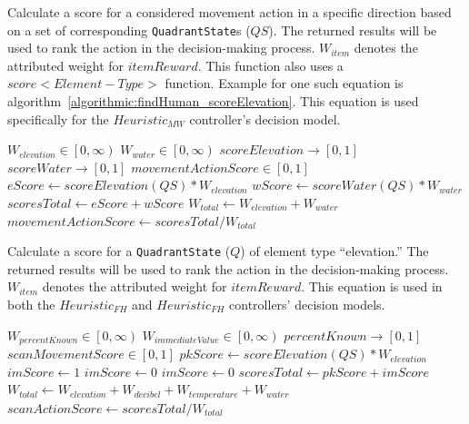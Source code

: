 \begin{algorithm}[H]
  \caption[Heuristic - Score Potential Movement Action (Map Water)]{Calculate a score for a considered movement action in a specific direction based on a set of corresponding \texttt{QuadrantState}s ($QS$). The returned results will be used to rank the action in the decision-making process. $W_{item}$ denotes the attributed weight for $itemReward$. This function also uses a $score<Element-Type>$ function. Example for one such equation is algorithm~\ref{algorithmic:findHuman_scoreElevation}. This equation is used specifically for the $Heuristic_{MW}$ controller's decision model.}
  \begin{algorithmic} \label{algorithmic:mapWater_scoreMovementAction}
    \REQUIRE $W_{elevation} \in \left[0, \infty \right)$
    \REQUIRE $W_{water} \in \left[0, \infty \right)$
    \ENSURE $scoreElevation \rightarrow \left[0, 1 \right]$
    \ENSURE $scoreWater \rightarrow \left[0, 1 \right]$
    \ENSURE $movementActionScore \in \left[0, 1 \right]$
    \STATE $eScore \leftarrow scoreElevation(QS) * W_{elevation}$
    \STATE $wScore \leftarrow scoreWater(QS) * W_{water}$
    \STATE $scoresTotal \leftarrow eScore + wScore$
    \STATE $W_{total} \leftarrow W_{elevation} + W_{water}$
    \RETURN $movementActionScore \leftarrow scoresTotal / W_{total}$
  \end{algorithmic}
\end{algorithm}
\vspace*{-3em}

\begin{algorithm}[H]
  \caption[Heuristic - Score Quadrant (Elevation)]{Calculate a score for a \texttt{QuadrantState} ($Q$) of element type ``elevation.'' The returned results will be used to rank the action in the decision-making process. $W_{item}$ denotes the attributed weight for $itemReward$. This equation is used in both the $Heuristic_{FH}$ and $Heuristic_{FH}$ controllers' decision models.}
  \begin{algorithmic} \label{algorithmic:findHuman_scoreElevation}
    \REQUIRE $W_{percentKnown} \in \left[0, \infty \right)$
    \REQUIRE $W_{immediateValue} \in \left[0, \infty \right)$
    \ENSURE $percentKnown \rightarrow \left[0, 1 \right]$
    \ENSURE $scanMovementScore \in \left[0, 1 \right]$
    \STATE $pkScore \leftarrow scoreElevation(QS) * W_{elevation}$
        \STATE $imScore \leftarrow 1$
      \ELSE
        \STATE $imScore \leftarrow 0$
      \ENDIF
    \ELSE
      \STATE $imScore \leftarrow 0$
    \ENDIF
    \STATE $scoresTotal \leftarrow pkScore + imScore$
    \STATE $W_{total} \leftarrow W_{elevation} + W_{decibel} + W_{temperature} + W_{water}$
    \RETURN $scanActionScore \leftarrow scoresTotal / W_{total}$
  \end{algorithmic}
\end{algorithm}


